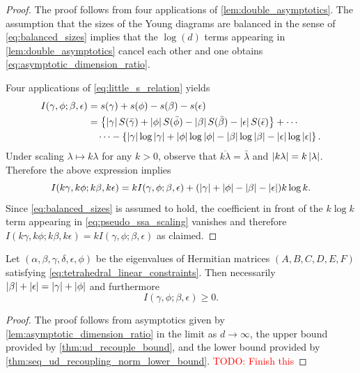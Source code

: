 \documentclass[notitlepage, 10pt]{article}
\begin{document}
\begin{proof}
    The proof follows from four applications of \cref{lem:double_asymptotics}.
    The assumption that the sizes of the Young diagrams are balanced in the sense of \cref{eq:balanced_sizes} implies that the $\log(d)$ terms appearing in \cref{lem:double_asymptotics} cancel each other and one obtains \cref{eq:asymptotic_dimension_ratio}.
    
    Four applications of \cref{eq:little_s_relation} yields
    \begin{align}
        \begin{split}
            I(\gamma,\phi;\beta,\epsilon)
            &= s(\gamma) + s(\phi) - s(\beta) - s(\epsilon) \\
            &= \left\{\left|\gamma\right|S(\bar \gamma) + \left|\phi\right| S(\bar \phi) - \left|\beta\right| S(\bar \beta) - \left|\epsilon\right| S(\bar \epsilon)\right\} + \cdots \\
            &\quad\cdots- \left\{\left|\gamma\right|\log \left|\gamma\right| + \left|\phi\right|\log \left|\phi\right| - \left|\beta\right|\log \left|\beta\right| - \left|\epsilon\right|\log \left|\epsilon\right|\right\}.
        \end{split}
    \end{align}
    Under scaling $\lambda \mapsto k \lambda$ for any $k>0$, observe that $\overline{k\lambda} = \bar \lambda$ and $\left|k\lambda\right| = k \left|\lambda\right|$.
    Therefore the above expression implies
    \begin{equation}
        \label{eq:pseudo_ssa_scaling}
        I(k\gamma,k\phi;k\beta,k\epsilon) = kI(\gamma,\phi;\beta,\epsilon) + (\left|\gamma\right|+\left|\phi\right|-\left|\beta\right|-\left|\epsilon\right|) k\log k.
    \end{equation}
    Since \cref{eq:balanced_sizes} is assumed to hold, the coefficient in front of the $k\log k$ term appearing in \cref{eq:pseudo_ssa_scaling} vanishes and therefore $I(k\gamma,k\phi;k\beta,k\epsilon) = k I(\gamma,\phi;\beta,\epsilon)$ as claimed.
\end{proof}

\begin{thm}
    Let $(\alpha,\beta,\gamma,\delta,\epsilon,\phi)$ be the eigenvalues of Hermitian matrices $(A,B,C,D,E,F)$ satisfying \cref{eq:tetrahedral_linear_constraints}.
    Then necessarily $\left|\beta\right|+\left|\epsilon\right| = \left|\gamma\right|+\left|\phi\right|$ and furthermore
    \begin{equation}
        I(\gamma, \phi; \beta, \epsilon) \geq 0.
    \end{equation} 
\end{thm}
\begin{proof}
    The proof follows from asymptotics given by \cref{lem:asymptotic_dimension_ratio} in the limit as $d \to \infty$, the upper bound provided by \cref{thm:ud_recouple_bound}, and the lower bound provided by \cref{thm:seq_ud_recoupling_norm_lower_bound}.
    \textcolor{red}{TODO: Finish this}
\end{proof}
\end{document}

